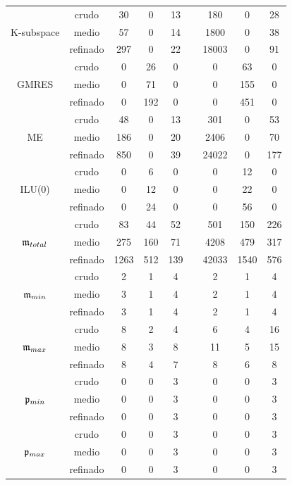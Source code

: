 \begin{table}[htb]
\begin{adjustbox}{width=0.8\columnwidth,center}
\begin{tabular}{  ccccccccc }
		\hline
		& crudo & 30 & 0 & 13 &  & 180 & 0 & 28 \\
		K-subspace  & medio & 57 & 0 & 14 &  & 1800 & 0 & 38 \\
		& refinado & 297 & 0 & 22  & & 18003 & 0 & 91 \\
		\hline
		& crudo & 0 & 26 & 0  & & 0 & 63 & 0 \\
		GMRES  & medio & 0 & 71 & 0 & & 0 & 155 & 0 \\
		& refinado & 0 & 192 & 0 & & 0 & 451 & 0 \\
		\hline
		& crudo & 48 & 0 & 13 & &  301 & 0 & 53 \\
		ME  & medio & 186 & 0 & 20  & & 2406 & 0 & 70 \\
		& refinado & 850 & 0 & 39  & & 24022 & 0 & 177 \\
		\hline
		& crudo & 0 & 6 & 0 & &  0 & 12 & 0 \\
		ILU(0)  & medio & 0 & 12 & 0  & & 0 & 22 & 0 \\
		& refinado & 0 & 24 & 0 &  & 0 & 56 & 0 \\
		\hline
		& crudo & 83 & 44 & 52  & & 501 & 150 & 226 \\
		$\mathfrak{m}_{total}$  & medio & 275 & 160 & 71  & & 4208 & 479 & 317 \\
		& refinado & 1263 & 512 & 139 &  & 42033 & 1540 & 576 \\
		\hline
		& crudo & 2 & 1 & 4  & & 2 & 1 & 4 \\
		$\mathfrak{m}_{min}$  & medio & 3 & 1 & 4  & & 2 & 1 & 4 \\
		& refinado & 3 & 1 & 4  & & 2 & 1 & 4 \\
		\hline
		& crudo & 8 & 2 & 4  & & 6 & 4 & 16 \\
		$\mathfrak{m}_{max}$  & medio & 8 & 3 & 8  & & 11 & 5 & 15 \\
		& refinado & 8 & 4 & 7  & & 8 & 6 & 8 \\
		\hline
		& crudo & 0 & 0 & 3  & & 0 & 0 & 3 \\
		$\mathfrak{p}_{min}$  & medio & 0 & 0 & 3 &  & 0 & 0 & 3 \\
		& refinado & 0 & 0 & 3  & & 0 & 0 & 3 \\
		\hline
		& crudo & 0 & 0 & 3  & & 0 & 0 & 3 \\
		$\mathfrak{p}_{max}$  & medio & 0 & 0 & 3 &  & 0 & 0 & 3  \\
		& refinado & 0 & 0 & 3  & & 0 & 0 & 3 \\
		\hline
	\end{tabular}
\end{adjustbox}
\end{table}

